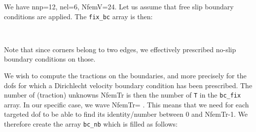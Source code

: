 We have nnp=12, nel=6, NfemV=24. Let us assume that free slip boundary conditions are applied. 
The {\tt fix\_bc} array is then:
\begin{center}
\\
\end{center}
Note that since corners belong to two edges, we effectively prescribed 
no-slip boundary conditions on those. 

We wish to compute the tractions on the boundaries, and more precisely for the dofs for which 
a Dirichlecht velocity boundary condition has been prescribed.
The number of (traction) unknowns NfemTr is then the number of {\tt T} in the {\tt bc\_fix} array.
In our specific case, we wave NfemTr= .
This means that we need for each targeted dof to be able to find its identity/number
between 0 and NfemTr-1. We therefore create the array {\tt bc\_nb} which is 
filled as follows: 
 
